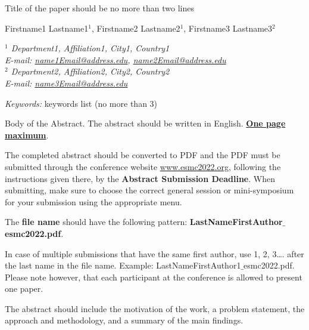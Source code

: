 \documentclass[10pt,a4paper]{article}
\begin{document}
{\parindent0pt

{\Large {Title of the paper should be no more than two lines}}


Firstname1 Lastname1$^{1}$, Firstname2 Lastname2$^{1}$, Firstname3 Lastname3$^{2}$

\textit{$^{1} $ Department1, Affiliation1, City1, Country1}\\
\textit{E-mail: \href{mailto:name1Email@address.edu}{name1Email@address.edu}, \href{mailto:name2Email@address.edu}{name2Email@address.edu}} \\
\textit{$^{2}$ Department2, Affiliation2, City2, Country2} \\
\textit{E-mail: \href{mailto:name3Email@address.edu}{name3Email@address.edu}} 

\vspace{10pt}
{\em Keywords: } keywords list (no more than 3)

\vspace{10pt}
}

\renewcommand{\section}[2]{}%


\noindent
Body of the Abstract. The abstract should be written in English. \underline{\textbf{One page maximum}}.  

The completed abstract should be converted to PDF and the PDF must be submitted through the conference website \href{www.esmc2022.org}{www.esmc2022.org}, following the instructions given there, by the \textbf{Abstract Submission Deadline}. When submitting, make sure to choose the correct general session or mini-symposium for your submission using the appropriate menu. 

The \textbf{file name} should have the following pattern: \textbf{LastNameFirstAuthor$\_$esmc2022.pdf}.  

In case of multiple submissions that have the same first author, use 1, 2, 3…. after the last name in the file name. Example: LastNameFirstAuthor1$\_$esmc2022.pdf. Please note however, that each participant at the conference is allowed to present one paper. 

The abstract should include the motivation of the work, a problem statement, the approach and methodology, and a summary of the main findings. 
\end{document}
